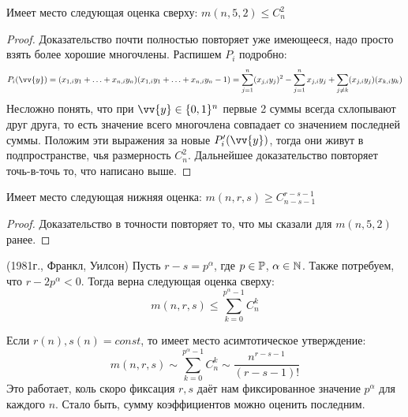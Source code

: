 \begin{theorem}
	Имеет место следующая оценка сверху: \(m(n, 5, 2) \le C_n^2\)
\end{theorem}

\begin{proof}
	Доказательство почти полностью повторяет уже имеющееся, надо просто взять более хорошие многочлены. Распишем $P_i$ подробно:
	\[
		P_i(\vv{y}) = (x_{1, i}y_1 + \ldots + x_{n, i}y_n)(x_{1, i}y_1 + \ldots + x_{n, i}y_n - 1) = \sum_{j = 1}^n (x_{j, i}y_j)^2 - \sum_{j = 1}^n x_{j, i}y_j + \sum_{j \neq k} (x_{j, i}y_j)(x_{k, i}y_k)
	\]
	Несложно понять, что при $\vv{y} \in \{0, 1\}^n$ первые 2 суммы всегда схлопывают друг друга, то есть значение всего многочлена совпадает со значением последней суммы. Положим эти выражения за новые $P'_i(\vv{y})$, тогда они живут в подпространстве, чья размерность $C_n^2$. Дальнейшее доказательство повторяет точь-в-точь то, что написано выше.
\end{proof}

\begin{theorem}
	Имеет место следующая нижняя оценка: $m(n, r, s) \ge C_{n - s - 1}^{r - s - 1}$
\end{theorem}

\begin{proof}
	Доказательство в точности повторяет то, что мы сказали для $m(n, 5, 2)$ ранее.
\end{proof}

\begin{theorem} (1981г., Франкл, Уилсон)
	Пусть $r - s = p^\alpha$, где $p \in \mathbb{P}$, $\alpha \in \mathbb{N}$. Также потребуем, что $r - 2p^\alpha < 0$. Тогда верна следующая оценка сверху:
	\[
		m(n, r, s) \le \sum_{k = 0}^{p^\alpha - 1} C_n^k
	\]
\end{theorem}

\begin{note}
	Если $r(n), s(n) = const$, то имеет место асимтотическое утверждение:
	\[
		m(n, r, s) \sim \sum_{k = 0}^{p^\alpha - 1} C_n^k \sim \frac{n^{r - s - 1}}{(r - s - 1)!}
	\]
	Это работает, коль скоро фиксация $r, s$ даёт нам фиксированное значение $p^\alpha$ для каждого $n$. Стало быть, сумму коэффициентов можно оценить последним.
\end{note}

